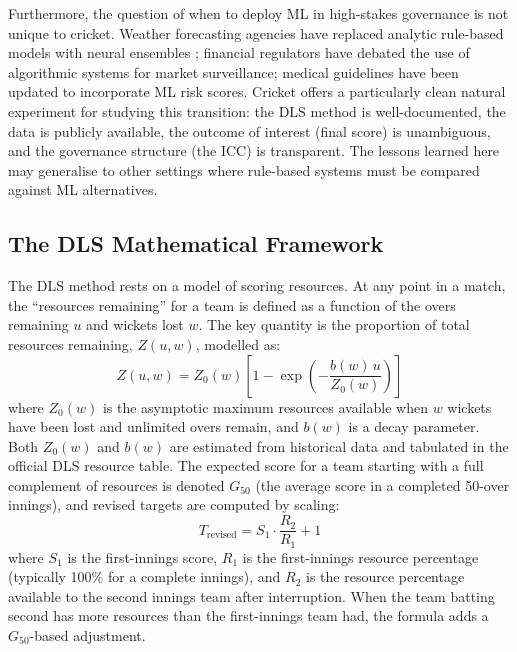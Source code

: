 \documentclass[10pt,a4paper,twocolumn]{article}
\begin{document}
Furthermore, the question of when to deploy ML in high-stakes governance is not unique to cricket. Weather forecasting agencies have replaced analytic rule-based models with neural ensembles \citep{Chen2016}; financial regulators have debated the use of algorithmic systems for market surveillance; medical guidelines have been updated to incorporate ML risk scores. Cricket offers a particularly clean natural experiment for studying this transition: the DLS method is well-documented, the data is publicly available, the outcome of interest (final score) is unambiguous, and the governance structure (the ICC) is transparent. The lessons learned here may generalise to other settings where rule-based systems must be compared against ML alternatives.

\subsection{The DLS Mathematical Framework}

The DLS method rests on a model of scoring resources. At any point in a match, the ``resources remaining'' for a team is defined as a function of the overs remaining $u$ and wickets lost $w$. The key quantity is the proportion of total resources remaining, $Z(u,w)$, modelled as:
\begin{equation}
Z(u,w) = Z_0(w) \left[1 - \exp\!\left(-\frac{b(w)\,u}{Z_0(w)}\right)\right]
\label{eq:dls_resource}
\end{equation}
where $Z_0(w)$ is the asymptotic maximum resources available when $w$ wickets have been lost and unlimited overs remain, and $b(w)$ is a decay parameter. Both $Z_0(w)$ and $b(w)$ are estimated from historical data and tabulated in the official DLS resource table. The expected score for a team starting with a full complement of resources is denoted $G_{50}$ (the average score in a completed 50-over innings), and revised targets are computed by scaling:
\begin{equation}
T_{\text{revised}} = S_1 \cdot \frac{R_2}{R_1} + 1
\label{eq:dls_target}
\end{equation}
where $S_1$ is the first-innings score, $R_1$ is the first-innings resource percentage (typically 100\% for a complete innings), and $R_2$ is the resource percentage available to the second innings team after interruption. When the team batting second has more resources than the first-innings team had, the formula adds a $G_{50}$-based adjustment.
\end{document}
